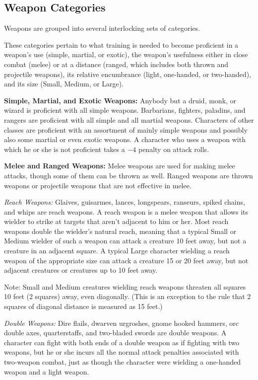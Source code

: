 \subsection{Weapon Categories}
Weapons are grouped into several interlocking sets of categories.

These categories pertain to what training is needed to become proficient in a weapon's use (simple, martial, or exotic), the weapon's usefulness either in close combat (melee) or at a distance (ranged, which includes both thrown and projectile weapons), its relative encumbrance (light, one-handed, or two-handed), and its size (Small, Medium, or Large).

\textbf{Simple, Martial, and Exotic Weapons:} Anybody but a druid, monk, or wizard is proficient with all simple weapons. Barbarians, fighters, paladins, and rangers are proficient with all simple and all martial weapons. Characters of other classes are proficient with an assortment of mainly simple weapons and possibly also some martial or even exotic weapons. A character who uses a weapon with which he or she is not proficient takes a $-4$ penalty on attack rolls.

\textbf{Melee and Ranged Weapons:} Melee weapons are used for making melee attacks, though some of them can be thrown as well. Ranged weapons are thrown weapons or projectile weapons that are not effective in melee.

\textit{Reach Weapons:} Glaives, guisarmes, lances, longspears, ranseurs, spiked chains, and whips are reach weapons. A reach weapon is a melee weapon that allows its wielder to strike at targets that aren't adjacent to him or her. Most reach weapons double the wielder's natural reach, meaning that a typical Small or Medium wielder of such a weapon can attack a creature 10 feet away, but not a creature in an adjacent square. A typical Large character wielding a reach weapon of the appropriate size can attack a creature 15 or 20 feet away, but not adjacent creatures or creatures up to 10 feet away.

Note: Small and Medium creatures wielding reach weapons threaten all squares 10 feet (2 squares) away, even diagonally. (This is an exception to the rule that 2 squares of diagonal distance is measured as 15 feet.)

\textit{Double Weapons:} Dire flails, dwarven urgroshes, gnome hooked hammers, orc double axes, quarterstaffs, and two-bladed swords are double weapons. A character can fight with both ends of a double weapon as if fighting with two weapons, but he or she incurs all the normal attack penalties associated with two-weapon combat, just as though the character were wielding a one-handed weapon and a light weapon.

